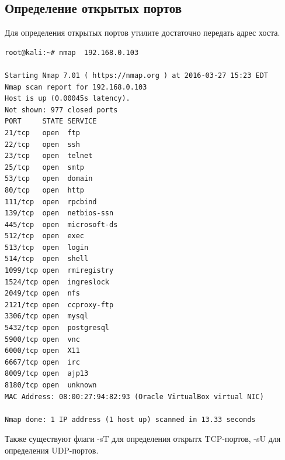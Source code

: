 \documentclass[10pt,a4paper]{report}
\begin{document}
\subsection{Определение открытых портов}
Для определения открытых портов утилите достаточно передать адрес хоста.
\begin{verbatim}
root@kali:~# nmap  192.168.0.103

Starting Nmap 7.01 ( https://nmap.org ) at 2016-03-27 15:23 EDT
Nmap scan report for 192.168.0.103
Host is up (0.00045s latency).
Not shown: 977 closed ports
PORT     STATE SERVICE
21/tcp   open  ftp
22/tcp   open  ssh
23/tcp   open  telnet
25/tcp   open  smtp
53/tcp   open  domain
80/tcp   open  http
111/tcp  open  rpcbind
139/tcp  open  netbios-ssn
445/tcp  open  microsoft-ds
512/tcp  open  exec
513/tcp  open  login
514/tcp  open  shell
1099/tcp open  rmiregistry
1524/tcp open  ingreslock
2049/tcp open  nfs
2121/tcp open  ccproxy-ftp
3306/tcp open  mysql
5432/tcp open  postgresql
5900/tcp open  vnc
6000/tcp open  X11
6667/tcp open  irc
8009/tcp open  ajp13
8180/tcp open  unknown
MAC Address: 08:00:27:94:82:93 (Oracle VirtualBox virtual NIC)

Nmap done: 1 IP address (1 host up) scanned in 13.33 seconds
\end{verbatim}
Также существуют флаги -sT для определения открытх TCP-портов, -sU для определения UDP-портов.
\end{document}
